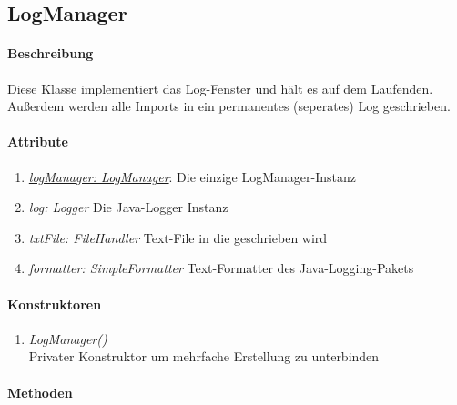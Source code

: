 \subsection*{LogManager}\label{log}

\paragraph{Beschreibung}
Diese Klasse implementiert das Log-Fenster und hält es auf dem Laufenden.
Außerdem werden alle Imports in ein permanentes (seperates) Log geschrieben.

\paragraph{Attribute}
\begin{enumerate}[$\bullet$]
	\item \underline{\textit{logManager: LogManager}}:  Die einzige LogManager-Instanz
	\item \textit{log: Logger} Die Java-Logger Instanz
	\item \textit{txtFile: FileHandler} Text-File in die geschrieben wird
	\item \textit{formatter: SimpleFormatter} Text-Formatter des Java-Logging-Pakets
\end{enumerate}

\paragraph{Konstruktoren}
\begin{enumerate}[-]
	\item \textit{LogManager()} \\
	Privater Konstruktor um mehrfache Erstellung zu unterbinden
\end{enumerate}


\paragraph{Methoden}

